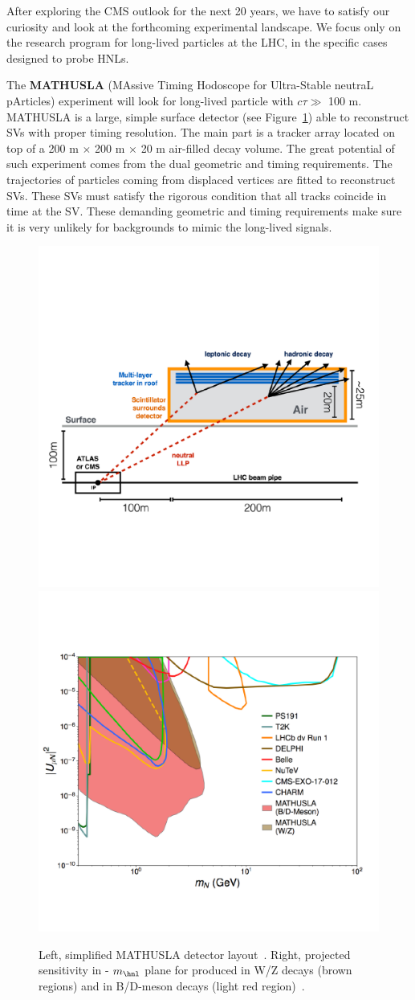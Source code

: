After exploring the CMS outlook for the next 20 years, we have to satisfy
our curiosity and look at the forthcoming experimental landscape. We
focus only on the research program for long-lived particles at the LHC,
in the specific cases designed to probe HNLs.

The \textbf{MATHUSLA} (MAssive Timing
Hodoscope for Ultra-Stable neutraL pArticles) experiment will look for
long-lived particle with $c\tau \gg$ 100 m. MATHUSLA is a
large, simple surface detector (see Figure~\ref{fig:mathu2}) able to reconstruct SVs with proper timing
resolution. The main
part is a tracker array located on top of a 200 m $\times$ 200 m
$\times$ 20 m air-filled decay volume.
The great potential of such experiment comes from the dual geometric and timing
requirements. The trajectories of particles coming from displaced
vertices are fitted to reconstruct SVs. These SVs must satisfy the rigorous
condition that all tracks coincide in time at the SV. These demanding geometric and timing
requirements make sure it is very unlikely for backgrounds to mimic
the long-lived signals.
\begin{figure}[h!]
\centering
    \includegraphics[clip,trim=0.3cm 0cm 1.cm 2cm, width=.45\textwidth]{Figures/c7/mathusla1.pdf}
    \includegraphics[clip,trim=0cm 2cm 0.5cm 3cm, width=.54\textwidth]{Figures/c7/mathusla2.pdf}
\caption{Left, simplified MATHUSLA detector
  layout~\cite{Alimena_2020}. Right, projected sensitivity in \mixparm
  - $m_\hnl$ plane for \hnl produced in W/Z decays (brown regions) and in B/D-meson decays (light red region)~\cite{Curtin_2019}.
}
\label{fig:mathu2}
\end{figure}

